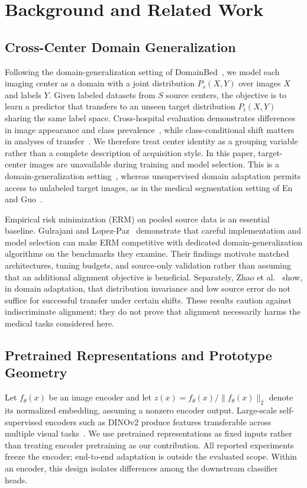 \section{Background and Related Work}
\label{sec:background}

\subsection{Cross-Center Domain Generalization}
Following the domain-generalization setting of DomainBed~\cite{gulrajani2021domainbed}, we model each imaging center as a domain with a joint distribution $P_s(X,Y)$ over images $X$ and labels $Y$. Given labeled datasets from $S$ source centers, the objective is to learn a predictor that transfers to an unseen target distribution $P_t(X,Y)$ sharing the same label space. Cross-hospital evaluation demonstrates differences in image appearance and class prevalence~\cite{zech2018generalization}, while class-conditional shift matters in analyses of transfer~\cite{zhao2019invariant}. We therefore treat center identity as a grouping variable rather than a complete description of acquisition style. In this paper, target-center images are unavailable during training and model selection. This is a domain-generalization setting~\cite{gulrajani2021domainbed}, whereas unsupervised domain adaptation permits access to unlabeled target images, as in the medical segmentation setting of En and Guo~\cite{en2024dpcl}.

Empirical risk minimization (ERM) on pooled source data is an essential baseline. Gulrajani and Lopez-Paz~\cite{gulrajani2021domainbed} demonstrate that careful implementation and model selection can make ERM competitive with dedicated domain-generalization algorithms on the benchmarks they examine. Their findings motivate matched architectures, tuning budgets, and source-only validation rather than assuming that an additional alignment objective is beneficial. Separately, Zhao et al.~\cite{zhao2019invariant} show, in domain adaptation, that distribution invariance and low source error do not suffice for successful transfer under certain shifts. These results caution against indiscriminate alignment; they do not prove that alignment necessarily harms the medical tasks considered here.

\subsection{Pretrained Representations and Prototype Geometry}
Let $f_\theta(x)$ be an image encoder and let $z(x)=f_\theta(x)/\|f_\theta(x)\|_2$ denote its normalized embedding, assuming a nonzero encoder output. Large-scale self-supervised encoders such as DINOv2 produce features transferable across multiple visual tasks~\cite{oquab2024dinov2}. We use pretrained representations as fixed inputs rather than treating encoder pretraining as our contribution. All reported experiments freeze the encoder; end-to-end adaptation is outside the evaluated scope. Within an encoder, this design isolates differences among the downstream classifier heads.


